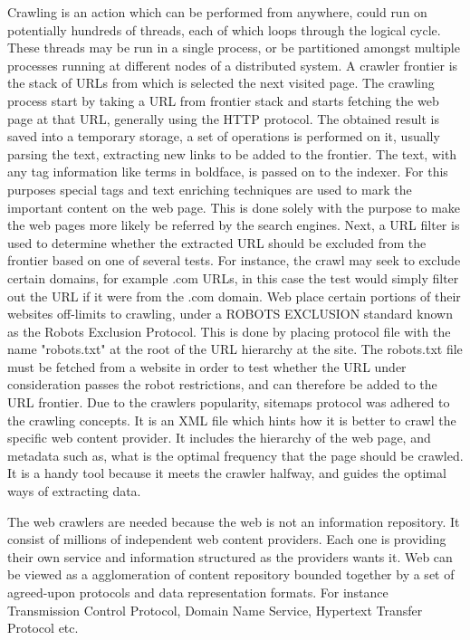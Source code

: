 Crawling is an action which can be performed from anywhere, could run on potentially hundreds of threads, each of which loops through the logical cycle. These threads may be run in a single process, or be partitioned amongst multiple processes running at different nodes of a distributed system. A crawler frontier is the stack of URLs from which is selected the next visited page. The crawling process start by taking a URL from frontier stack and starts fetching the web page at that URL, generally using the HTTP protocol. The obtained result is saved into a temporary storage, a set of operations is performed on it, usually parsing the text, extracting new links to be added to the frontier. The text, with any tag information like terms in
boldface, is passed on to the indexer. For this purposes special tags and text enriching techniques are used to mark the important content on the web page. This is done solely with the purpose to make the web pages more likely be referred by the search engines. Next, a URL filter is used to determine whether the extracted URL should be excluded from the frontier based on one of several tests. For instance, the crawl may seek to exclude certain domains, for example .com  URLs, in this case the test would simply filter out the URL if it were from the .com domain. Web place certain portions of their websites off-limits to crawling, under a ROBOTS EXCLUSION standard known as the Robots Exclusion Protocol. This is done by placing protocol file with the name "robots.txt" at the root of the URL hierarchy at the site. The robots.txt file must be fetched from a website in order to test whether the URL under consideration passes the robot restrictions, and can therefore be added to the URL frontier. Due to the crawlers popularity, sitemaps protocol was adhered to the crawling concepts. It is an XML file which hints how it is better to crawl the specific web content provider. It includes the hierarchy of the web page, and metadata such as, what is the optimal frequency that the page should be crawled. It is a handy tool because it meets the crawler halfway, and guides the optimal ways of extracting data.

The web crawlers are needed because the web is not an information repository. It consist of millions of independent web content providers. Each one is providing their own service and information structured as the providers wants it. Web can be viewed as a agglomeration of content repository bounded together by a set of agreed-upon protocols and data representation formats. For instance Transmission Control Protocol, Domain Name Service, Hypertext Transfer Protocol etc.

